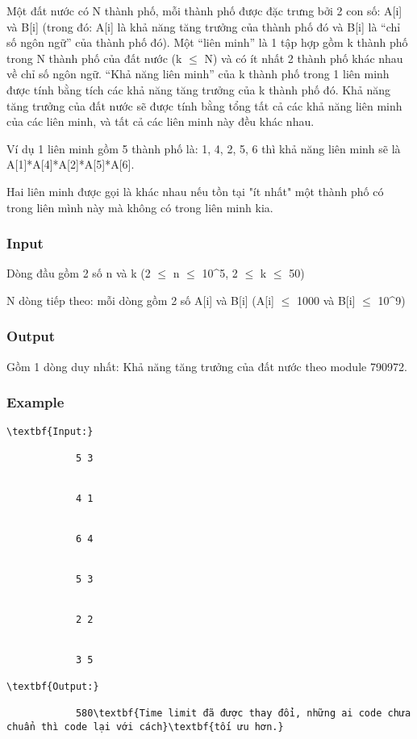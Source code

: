 



    Một đất nước có N thành phố, mỗi thành phố được đặc trưng bởi 2 con số: A[i] và B[i] (trong đó: A[i] là khả năng tăng trưởng của thành phố đó và B[i] là “chỉ số ngôn ngữ” của thành phố đó). Một “liên minh” là 1 tập hợp gồm k thành phố trong N thành phố của đất nước (k  $\le$  N) và có ít nhất 2 thành phố khác nhau về chỉ số ngôn ngữ. “Khả năng liên minh” của k thành phố trong 1 liên minh được tính bằng tích các khả năng tăng trưởng của k thành phố đó. Khả năng tăng trưởng của đất nước sẽ được tính bằng tổng tất cả các khả năng liên minh của các liên minh, và tất cả các liên minh này đều khác nhau.   



    Ví dụ 1 liên minh gồm 5 thành phố là: 1, 4, 2, 5, 6 thì khả năng liên minh sẽ là A[1]*A[4]*A[2]*A[5]*A[6].   



    Hai liên minh được gọi là khác nhau nếu tồn tại "ít nhất" một thành phố có trong liên mình này mà không có trong liên minh kia.   

\subsubsection{   Input  }



    Dòng đầu gồm 2 số n và k (2 $\le$  n  $\le$  10^5, 2  $\le$  k  $\le$  50)   



    N dòng tiếp theo: mỗi dòng gồm 2 số A[i] và B[i] (A[i]  $\le$  1000 và B[i]  $\le$  10^9)   

\subsubsection{   Output  }

    Gồm 1 dòng duy nhất: Khả năng tăng trưởng của đất nước theo module 790972.   

\subsubsection{    Example   }
\begin{verbatim}
\textbf{Input:}

            5 3


            4 1


            6 4


            5 3


            2 2


            3 5

\textbf{Output:}

            580\textbf{Time limit đã được thay đổi, những ai code chưa chuẩn thì code lại với cách}\textbf{tối ưu hơn.}\end{verbatim}
